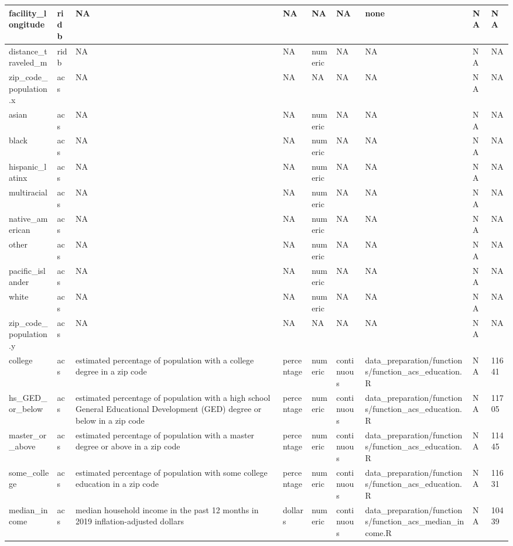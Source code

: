\documentclass[
]{book}
\begin{document}
\begin{table}
{\begin{tabular}[t]{l|l|l|l|l|l|l|l|l}
facility\_longitude & ridb & NA & NA & NA & NA & none & NA & NA\\
\hline
distance\_traveled\_m & ridb & NA & NA & numeric & NA & NA & NA & NA\\
\hline
zip\_code\_population.x & acs & NA & NA & NA & NA & NA & NA & NA\\
\hline
asian & acs & NA & NA & numeric & NA & NA & NA & NA\\
\hline
black & acs & NA & NA & numeric & NA & NA & NA & NA\\
\hline
hispanic\_latinx & acs & NA & NA & numeric & NA & NA & NA & NA\\
\hline
multiracial & acs & NA & NA & numeric & NA & NA & NA & NA\\
\hline
native\_american & acs & NA & NA & numeric & NA & NA & NA & NA\\
\hline
other & acs & NA & NA & numeric & NA & NA & NA & NA\\
\hline
pacific\_islander & acs & NA & NA & numeric & NA & NA & NA & NA\\
\hline
white & acs & NA & NA & numeric & NA & NA & NA & NA\\
\hline
zip\_code\_population.y & acs & NA & NA & NA & NA & NA & NA & NA\\
\hline
college & acs & estimated percentage of population with a college degree in a zip code & percentage & numeric & continuous & data\_preparation/functions/function\_acs\_education.R & NA & 11641\\
\hline
hs\_GED\_or\_below & acs & estimated percentage of population with a high school General Educational Development (GED) degree or below in a zip code & percentage & numeric & continuous & data\_preparation/functions/function\_acs\_education.R & NA & 11705\\
\hline
master\_or\_above & acs & estimated percentage of population with a master degree or above in a zip code & percentage & numeric & continuous & data\_preparation/functions/function\_acs\_education.R & NA & 11445\\
\hline
some\_college & acs & estimated percentage of population with some college education in a zip code & percentage & numeric & continuous & data\_preparation/functions/function\_acs\_education.R & NA & 11631\\
\hline
median\_income & acs & median household income in the past 12 months in 2019 inflation-adjusted dollars & dollars & numeric & continuous & data\_preparation/functions/function\_acs\_median\_income.R & NA & 10439\\

\end{tabular}}
\end{table}
\end{document}

